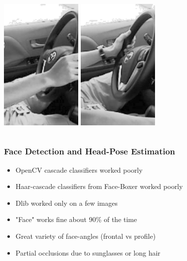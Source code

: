 \documentclass{beamer}
\begin{document}
\begin{frame}
\begin{columns}
\begin{column}{0.5\textwidth}
\begin{center}
     				\includegraphics[width=0.3\textwidth]{steering_wheel3}\hspace{0.1cm}
     				\includegraphics[width=0.3\textwidth]{steering_wheel4}
     				
     			\end{center}
     		\end{column}
     	\end{columns}
     	
     \end{frame}

	
	\begin{frame}
		\frametitle{Face Detection and Head-Pose Estimation}

		\begin{itemize}
		\item OpenCV cascade classifiers worked poorly
		\item Haar-cascade classifiers from Face-Boxer worked poorly
		\item Dlib worked only on a few images
		\item "Face" works fine about 90\% of the time
		\vspace{0.3cm}
		\item Great variety of face-angles (frontal vs profile)
		\item Partial occlusions due to sunglasses or long hair
		
		\end{itemize}
	\end{frame}
	
\end{document}
